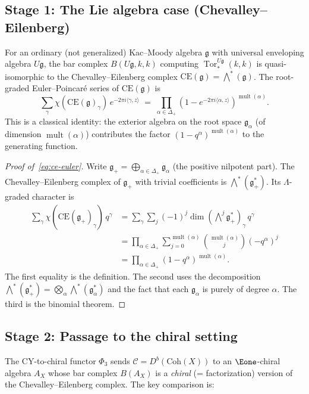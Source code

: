 \documentclass[11pt]{article}
\theoremstyle{definition}
\theoremstyle{remark}
\DeclareMathOperator{\mult}{mult}
\DeclareMathOperator{\Tor}{Tor}
\newcommand{\frakg}{\mathfrak{g}}
\newcommand{\cC}{\mathcal{C}}
\begin{document}
\subsection{Stage 1: The Lie algebra case (Chevalley--Eilenberg)}

For an ordinary (not generalized) Kac--Moody algebra $\frakg$ with
universal enveloping algebra $U\frakg$, the bar complex $B(U\frakg, k, k)$
computing $\Tor^{U\frakg}_*(k,k)$ is quasi-isomorphic to the
Chevalley--Eilenberg complex $\mathrm{CE}(\frakg) = \bigwedge^*(\frakg)$.
The root-graded Euler--Poincar\'e series of $\mathrm{CE}(\frakg)$ is
\begin{equation}
\label{eq:ce-euler}
 \sum_{\gamma} \chi(\mathrm{CE}(\frakg)_\gamma)\, e^{-2\pi i\langle\gamma,z\rangle}
 \;=\;
 \prod_{\alpha \in \Delta_+}(1 - e^{-2\pi i\langle\alpha,z\rangle})^{\mult(\alpha)}.
\end{equation}
This is a classical identity: the exterior algebra on the root space
$\frakg_\alpha$ (of dimension $\mult(\alpha)$) contributes the factor
$(1 - q^\alpha)^{\mult(\alpha)}$ to the generating function.

\begin{proof}[Proof of~\eqref{eq:ce-euler}]
Write $\frakg_+ = \bigoplus_{\alpha \in \Delta_+} \frakg_\alpha$
(the positive nilpotent part). The Chevalley--Eilenberg complex of
$\frakg_+$ with trivial coefficients is $\bigwedge^*(\frakg_+^*)$.
Its $\Lambda$-graded character is
\begin{align*}
 \sum_\gamma \chi(\mathrm{CE}(\frakg_+)_\gamma) \, q^\gamma
 &= \sum_\gamma \sum_j (-1)^j \dim (\textstyle\bigwedge^j \frakg_+^*)_\gamma \, q^\gamma \\
 &= \prod_{\alpha \in \Delta_+} \sum_{j=0}^{\mult(\alpha)} \binom{\mult(\alpha)}{j} (-q^\alpha)^j \\
 &= \prod_{\alpha \in \Delta_+} (1 - q^\alpha)^{\mult(\alpha)}.
\end{align*}
The first equality is the definition. The second uses the decomposition
$\bigwedge^*(\frakg_+^*) = \bigotimes_{\alpha} \bigwedge^*(\frakg_\alpha^*)$
and the fact that each $\frakg_\alpha$ is purely of degree $\alpha$.
The third is the binomial theorem.
\end{proof}

\subsection{Stage 2: Passage to the chiral setting}

The CY-to-chiral functor $\Phi_3$ sends $\cC = D^b(\mathrm{Coh}(X))$ to
an $\Eone$-chiral algebra $A_X$ whose bar complex $B(A_X)$ is a
\emph{chiral} (= factorization) version of the Chevalley--Eilenberg
complex. The key comparison is:
\end{document}
